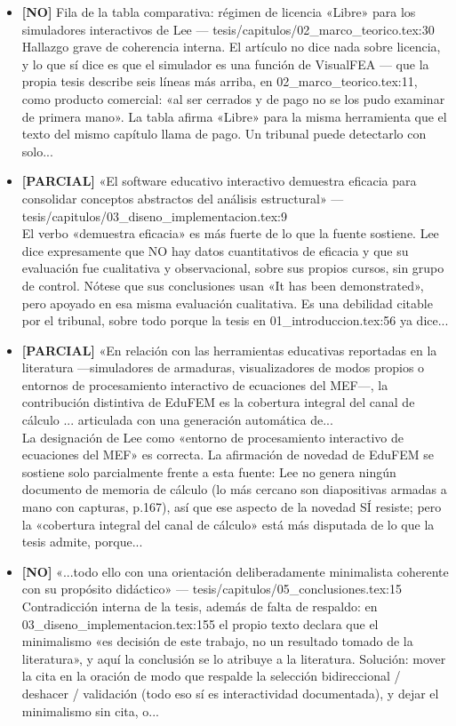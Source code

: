 \documentclass[11pt,a4paper]{article}
\newcommand{\campo}[1]{\textcolor{gris}{\footnotesize #1}}
\begin{document}
\begin{itemize}
\item \textbf{[NO]} Fila de la tabla comparativa: régimen de licencia «Libre» para los simuladores interactivos de Lee --- tesis/capitulos/02\_marco\_teorico.tex:30
\\ \campo{Hallazgo grave de coherencia interna. El artículo no dice nada sobre licencia, y lo que sí dice es que el simulador es una función de VisualFEA --- que la propia tesis describe seis líneas más arriba, en 02\_marco\_teorico.tex:11, como producto comercial: «al ser cerrados y de pago no se los pudo examinar de primera mano». La tabla afirma «Libre» para la misma herramienta que el texto del mismo capítulo llama de pago. Un tribunal puede detectarlo con solo...}
\item \textbf{[PARCIAL]} «El software educativo interactivo demuestra eficacia para consolidar conceptos abstractos del análisis estructural» --- tesis/capitulos/03\_diseno\_implementacion.tex:9
\\ \campo{El verbo «demuestra eficacia» es más fuerte de lo que la fuente sostiene. Lee dice expresamente que NO hay datos cuantitativos de eficacia y que su evaluación fue cualitativa y observacional, sobre sus propios cursos, sin grupo de control. Nótese que sus conclusiones usan «It has been demonstrated», pero apoyado en esa misma evaluación cualitativa. Es una debilidad citable por el tribunal, sobre todo porque la tesis en 01\_introduccion.tex:56 ya dice...}
\item \textbf{[PARCIAL]} «En relación con las herramientas educativas reportadas en la literatura ---simuladores de armaduras, visualizadores de modos propios o entornos de procesamiento interactivo de ecuaciones del MEF---, la contribución distintiva de EduFEM es la cobertura integral del canal de cálculo ... articulada con una generación automática de...
\\ \campo{La designación de Lee como «entorno de procesamiento interactivo de ecuaciones del MEF» es correcta. La afirmación de novedad de EduFEM se sostiene solo parcialmente frente a esta fuente: Lee no genera ningún documento de memoria de cálculo (lo más cercano son diapositivas armadas a mano con capturas, p.167), así que ese aspecto de la novedad SÍ resiste; pero la «cobertura integral del canal de cálculo» está más disputada de lo que la tesis admite, porque...}
\item \textbf{[NO]} «...todo ello con una orientación deliberadamente minimalista coherente con su propósito didáctico» --- tesis/capitulos/05\_conclusiones.tex:15
\\ \campo{Contradicción interna de la tesis, además de falta de respaldo: en 03\_diseno\_implementacion.tex:155 el propio texto declara que el minimalismo «es decisión de este trabajo, no un resultado tomado de la literatura», y aquí la conclusión se lo atribuye a la literatura. Solución: mover la cita en la oración de modo que respalde la selección bidireccional / deshacer / validación (todo eso sí es interactividad documentada), y dejar el minimalismo sin cita, o...}
\end{itemize}
\end{document}
